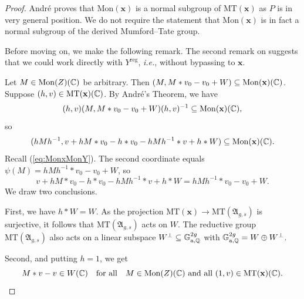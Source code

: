 \documentclass[12pt,oneside]{amsart}
\begin{document}
\begin{proof}

  
  Andr\'e \cite[Theorem~1]{Andre92} proves that
  $\mathrm{Mon}(\mathbf{x})$ is a normal subgroup of
  $\mathrm{MT}(\mathbf{x})$ as $P$ is in very general position. 
  We do not require the statement that $\mathrm{Mon}(\mathbf{x})$ is
  in fact a normal subgroup of the derived Mumford--Tate group.

  Before moving on, we make the following remark. The second remark on \cite[page~11]{Andre92} suggests that we
  could work
  directly with $Y^{\mathrm{reg}}$, \textit{i.e.}, without bypassing to
  $\mathbf{x}$.%

  Let $M\in \mathrm{Mon}(Z)({\mathbb{C}})$ be arbitrary. Then
  $(M,M*v_0-v_0+W)\subseteq \mathrm{Mon}(\mathbf{x})({\mathbb{C}})$. 
  Suppose $(h,v)\in \mathrm{MT}(\mathbf{x})({\mathbb{C}})$. By Andr\'e's
  Theorem, we have
  \begin{equation*}
    (h,v) (M,M*v_0-v_0+W) (h,v)^{-1} \subseteq
    \mathrm{Mon}(\mathbf{x})({\mathbb{C}}),
  \end{equation*}
  so
  \begin{equation*}
    (hMh^{-1},v+hM*v_0-h*v_0 -hMh^{-1}*v+h*W)\subseteq
    \mathrm{Mon}(\mathbf{x})({\mathbb{C}}).
  \end{equation*}
  Recall (\ref{eq:MonxMonY}). The second coordinate equals $\psi(M)= hMh^{-1}*v_0-v_0+ W$, so 
  \begin{equation*}
    v+hM*v_0-h*v_0-hMh^{-1}*v + h*W= hMh^{-1}*v_0-v_0 + W.
  \end{equation*}
  We draw two conclusions.
  
  First, we have $h*W=W$. As the projection
  $\mathrm{MT}(\mathbf{x})\rightarrow\mathrm{MT}(\mathfrak{A}_{g,s})$ is
  surjective, it follows that $\mathrm{MT}(\mathfrak{A}_{g,s})$ acts on
  $W$.
  The reductive group $\mathrm{MT}(\mathfrak{A}_{g,s})$  also acts on a
  linear subspace $W^{\perp} \subseteq {\mathbb{G}}_{\mathrm{a},{\mathbb{Q}}}^{2g}$ with
  ${\mathbb{G}}_{\mathrm{a},{\mathbb{Q}}}^{2g}= W\oplus W^{\perp}$.
  
  Second, 
  and putting $h=1$,  we get 
  \begin{equation}
    \label{eq:monactionW}
    M*v-v \in W({\mathbb{C}})
    \quad\text{for all}\quad M\in \mathrm{Mon}(Z)({\mathbb{C}}) \text{ and all
    }
    (1,v) \in \mathrm{MT}(\mathbf{x})({\mathbb{C}}). 
  \end{equation}
  

\end{proof}
\end{document}

